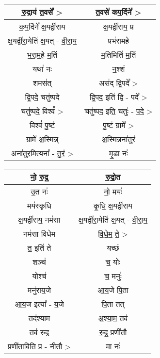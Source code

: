 {\centering
\begin{longtable}{|c|c|}
\hline
रु॒द्राय॑ त॒वसे᳚ >                  & त॒वसे॑ कप॒र्दिने᳚ >\\
\hline
क॒प॒र्दिने᳚ क्ष॒यद्वी॑राय             & क्ष॒यद्वी॑राय॒ प्र\\
\hline
क्ष॒यद्वी॑रा॒येति॑ क्ष॒यत् - वी॒रा॒य॒     & प्रभ॑रामहे\\
\hline
भ॒रा॒म॒हे॒ म॒तिं                    & म॒तिमिति॑ म॒तिं\\
\hline
यथा॑ नः                       & न॒श्शं\\
\hline
शमस॑त्                         & अस॑द् द्वि॒पदे᳚ >\\
\hline
द्वि॒पदे॒ चतु॑ष्पदे                  & द्वि॒पद॒ इति॑ द्वि - पदे᳚ >\\
\hline
चतु॑ष्पदे॒ विश्वं᳚ >                 & चतु॑ष्पद॒ इति॒ चतुः॑ - प॒दे॒ >\\
\hline
विश्वं॑ पु॒ष्टं                     & पु॒ष्टं ग्रामे᳚ >\\
\hline
ग्रामे॑ अ॒स्मिन्न्                  & अ॒स्मिन्नना॑तुरं\\
\hline
अना॑तुर॒मित्यना᳚ - तु॒रं॒ >           & मृ॒डा नः॑\\
\hline
\end{longtable}
}
{\centering
\begin{longtable}{|c|c|}
\hline
नो॒ रु॒द्र॒                       & रु॒द्रो॒त\\
\hline
उ॒त नः॑                        & नो॒ मयः॑\\
\hline
मय॑स्कृधि                       & कृ॒धि॒ क्ष॒यद्वी॑राय\\
\hline
क्ष॒यद्वी॑राय॒ नम॑सा               & क्ष॒यद्वी॑रा॒येति॑ क्ष॒यत् - वी॒रा॒य॒\\
\hline
नम॑सा विधेम                    & वि॒धे॒म॒ ते॒ >\\
\hline
त॒ इति॑ ते                      & यच्छं\\
\hline
शञ्च॑                          & च॒ योः\\
\hline
योश्च॑                         & च॒ मनुः॑\\
\hline
मनु॑राय॒जे                       & आ॒य॒जे पि॒ता\\
\hline
आ॒य॒ज इत्या᳚ - य॒जे                & पि॒ता तत्\\
\hline
तद॑श्याम                       & अ॒श्या॒म॒ तव॑\\
\hline
तव॑ रुद्र                       & रु॒द्र॒ प्रणी॑तौ\\
\hline
प्रणी॑ता॒विति॒ प्र - नी॒तौ॒ >       & मा नः॑\\
\hline
\end{longtable}
}
